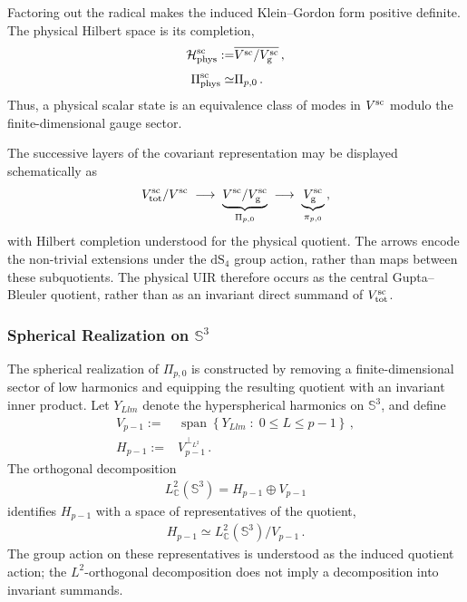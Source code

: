\documentclass{SciPost}
\begin{document}
Factoring out the radical makes the induced Klein--Gordon form positive definite. The physical Hilbert space is its completion,
\begin{align}\label{eq:scalar-physical-space}
    {\cal H}_{\rm phys}^{\rm sc}
    :=&
    \overline{
        V^{\rm sc}/V_{\rm g}^{\rm sc}
    } \,,
    \\[3pt]
    \Pi_{\rm phys}^{\rm sc}
    \simeq&\Pi_{p,0} \,.
\end{align}
Thus, a physical scalar state is an equivalence class of modes in $V^{\rm sc}$ modulo the finite-dimensional gauge sector.

The successive layers of the covariant representation may be displayed schematically as
\begin{align}
    V_{\rm tot}^{\rm sc}/V^{\rm sc}
    \;\longrightarrow\;
    \underbrace{
        V^{\rm sc}/V_{\rm g}^{\rm sc}
    }_{\Pi_{p,0}}
    \;\longrightarrow\;
    \underbrace{
        V_{\rm g}^{\rm sc}
    }_{\pi_{p,0}} \,,
\end{align}
with Hilbert completion understood for the physical quotient. The arrows encode the non-trivial extensions under the $\mathrm{dS}_4$ group action, rather than maps between these subquotients. The physical UIR therefore occurs as the central Gupta--Bleuler quotient, rather than as an invariant direct summand of $V_{\rm tot}^{\rm sc}$.


\subsubsection{Spherical Realization on $\mathbb{S}^3$}

The spherical realization of $\Pi_{p,0}$ is constructed by removing a finite-dimensional sector of low harmonics and equipping the resulting quotient with an invariant inner product. Let $Y_{Llm}$ denote the hyperspherical harmonics on $\mathbb S^3$, and define
\begin{align}
    V_{p-1}
    :=&
    \operatorname{span}
    \left\{
        Y_{Llm}\;\colon\;0\leqslant L\leqslant p-1
    \right\} \,,
    \\[3pt]
    H_{p-1}
    :=&
    V_{p-1}^{\perp_{L^2}} \,.
\end{align}
The orthogonal decomposition
\begin{align}
    L^2_{\mathbb C}(\mathbb S^3)
    =
    H_{p-1}\oplus V_{p-1}
\end{align}
identifies $H_{p-1}$ with a space of representatives
of the quotient,
\begin{align}
    H_{p-1}
    \simeq
    L^2_{\mathbb C}(\mathbb S^3)/V_{p-1} \,.
\end{align}
The group action on these representatives is understood as the induced quotient action; the $L^2$-orthogonal decomposition does not imply a decomposition into invariant summands.
\end{document}

